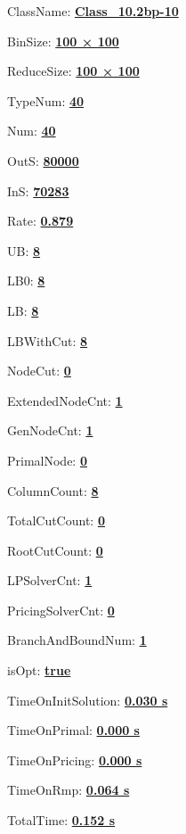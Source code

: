 \documentclass[11pt]{article}
\begin{document}
\pagestyle{empty}


ClassName: \underline{\textbf{Class_10.2bp-10}}
\par
BinSize: \underline{\textbf{100 × 100}}
\par
ReduceSize: \underline{\textbf{100 × 100}}
\par
TypeNum: \underline{\textbf{40}}
\par
Num: \underline{\textbf{40}}
\par
OutS: \underline{\textbf{80000}}
\par
InS: \underline{\textbf{70283}}
\par
Rate: \underline{\textbf{0.879}}
\par
UB: \underline{\textbf{8}}
\par
LB0: \underline{\textbf{8}}
\par
LB: \underline{\textbf{8}}
\par
LBWithCut: \underline{\textbf{8}}
\par
NodeCut: \underline{\textbf{0}}
\par
ExtendedNodeCnt: \underline{\textbf{1}}
\par
GenNodeCnt: \underline{\textbf{1}}
\par
PrimalNode: \underline{\textbf{0}}
\par
ColumnCount: \underline{\textbf{8}}
\par
TotalCutCount: \underline{\textbf{0}}
\par
RootCutCount: \underline{\textbf{0}}
\par
LPSolverCnt: \underline{\textbf{1}}
\par
PricingSolverCnt: \underline{\textbf{0}}
\par
BranchAndBoundNum: \underline{\textbf{1}}
\par
isOpt: \underline{\textbf{true}}
\par
TimeOnInitSolution: \underline{\textbf{0.030 s}}
\par
TimeOnPrimal: \underline{\textbf{0.000 s}}
\par
TimeOnPricing: \underline{\textbf{0.000 s}}
\par
TimeOnRmp: \underline{\textbf{0.064 s}}
\par
TotalTime: \underline{\textbf{0.152 s}}
\par
\newpage


\end{document}
